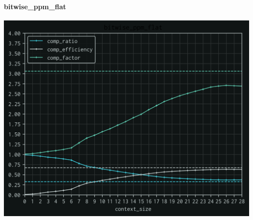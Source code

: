 \documentclass{beamer}
\theoremstyle{theoreme}
\begin{document}
\begin{frame}
  \frametitle{\secname{}}
  \framesubtitle{bitwise\_ppm\_flat}

  \vspace{-0.45cm}

  \begin{center}
    \includegraphics[scale=0.7]{bitwise_ppm_flat.png}
  \end{center}
\end{frame}
\end{document}
